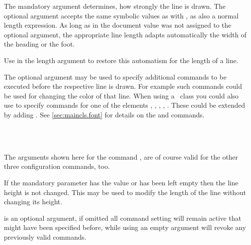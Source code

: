 The mandatory argument  determines,
how strongly the line is drawn.
The optional argument  accepts the same symbolic values as
 with , as also a normal length expression.
As long as in the document  value was not assigned to the
optional argument, the appropriate line length adapts automatically
the width of the heading or the foot.

Use  in the length argument to restore this
automatism for the length of a line.

The
optional argument  may be used to specify additional commands
to be executed before the respective line is drawn.
For example such commands could be used for changing the
color of that line.
When using a \KOMAScript\ class you could also use
 to specify commands
for one of the elements
,
,
,
,
.
These could be extended by adding .
See \autoref{sec:maincls.font} for details on the  and
 commands.

\begin{Declaration}
\\
\Parameter{}\\
\Parameter{}\OParameter{}
\end{Declaration}%
The arguments shown here for the command ,
are of course valid for the other three configuration commands, too.

If the mandatory parameter has the value  or has been
left empty then the line height is not changed.
This may be used to modify the length of the line without changing its height.

 is an optional argument, if omitted all command setting
will remain active that might have been specified before, while using
an empty  argument will revoke any previously valid
commands.

